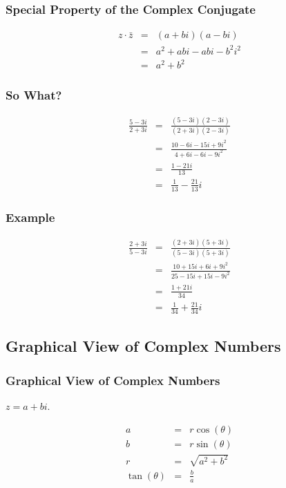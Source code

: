 \begin{frame}
  \frametitle{Special Property of the Complex Conjugate}

  \begin{eqnarray*}
    z\cdot\bar{z} & = & (a+bi)(a-bi) \\
    & = & a^2 +abi - abi - b^2 i^2 \\
    & = & a^2 + b^2
  \end{eqnarray*}

\end{frame}



\begin{frame}
  \frametitle{So What?}

  \begin{eqnarray*}
    \frac{5-3i}{2+3i} & = & \frac{(5-3i)(2-3i)}{(2+3i)(2-3i)} \\
    & = & \frac{10-6i-15i+9i^2}{4+6i-6i-9i^2} \\
    & = & \frac{1-21i}{13} \\
    & = & \frac{1}{13} - \frac{21}{13} i
  \end{eqnarray*}

\end{frame}

\begin{frame}
  \frametitle{Example}

  \begin{eqnarray*}
    \frac{2+3i}{5-3i} & = & \frac{(2+3i)(5+3i)}{(5-3i)(5+3i)} \\
    & = & \frac{10+15i+6i+9i^2}{25-15i+15i-9i^2} \\
    & = & \frac{1+21i}{34} \\
    & = & \frac{1}{34} + \frac{21}{34}i
  \end{eqnarray*}

\end{frame}

\subsection{Graphical View of Complex Numbers}

\begin{frame}
  \frametitle{Graphical View of Complex Numbers}
 
  $z=a+bi$.

  
  \begin{eqnarray*}
    a & = & r\cos(\theta) \\
    b & = & r\sin(\theta) \\
    r & = & \sqrt{a^2+b^2} \\
    \tan(\theta) & = & \frac{b}{a}
  \end{eqnarray*}

\end{frame}


